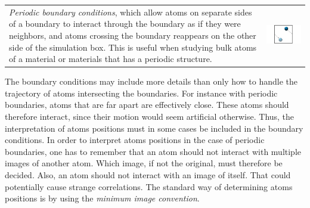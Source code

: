 \documentclass[twoside,english]{uiofysmaster}
\begin{document}
\begin{tabular}{p{} p{}}
	\\*
	 \vspace{0pt} {\it Periodic boundary conditions}, which allow atoms on separate sides of a boundary to interact through the boundary as if they were neighbors, and atoms crossing the boundary reappears on the other side of the simulation box. This is useful when studying bulk atoms of a material or materials that has a periodic structure.
	& \vspace{0pt} \hspace*{-1.3cm} \includegraphics[width=1.3\linewidth]{figures/BoundaryConditions/periodic.pdf}
\end{tabular}
\vspace{10mm}

\noindent
The boundary conditions may include more details than only how to handle the trajectory of atoms intersecting the boundaries. 
For instance with periodic boundaries, atoms that are far apart are effectively close. 
These atoms should therefore interact, since their motion would seem artificial otherwise. 
Thus, the interpretation of atoms positions must in some cases be included in the boundary conditions. 
In order to interpret atoms positions in the case of periodic boundaries, one has to remember that an atom should not interact with multiple images of another atom. 
Which image, if not the original, must therefore be decided. 
Also, an atom should not interact with an image of itself. That could potentially cause strange correlations. 
The standard way of determining atoms positions is by using the {\it minimum image convention}.
\end{document}

